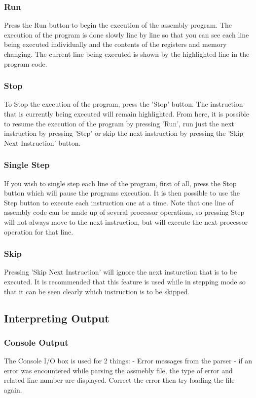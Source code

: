 \subsubsection{Run}
Press the Run button to begin the execution of the assembly program.  The execution of the program is done slowly line by line so that you can see each line being executed individually and the contents of the registers and memory changing.  The current line being executed is shown by the highlighted line in the program code.

\subsubsection{Stop}
To Stop the execution of the program, press the 'Stop' button.  The instruction that is currently being executed will remain highlighted.  From here, it is possible to resume the execution of the program by pressing 'Run', run just the next instruction by pressing 'Step' or skip the next instruction by pressing the 'Skip Next Instruction' button.

\subsubsection{Single Step}
If you wish to single step each line of the program, first of all, press the Stop button which will pause the programs execution.  It is then possible to use the Step button to execute each instruction one at a time.  Note that one line of assembly code can be made up of several processor operations, so pressing Step will not always move to the next instruction, but will execute the next processor operation for that line.

\subsubsection{Skip}
Pressing 'Skip Next Instruction' will ignore the next insturction that is to be executed.  It is recommended that this feature is used while in stepping mode so that it can be seen clearly which instruction is to be skipped.


\subsection{Interpreting Output}


\subsubsection{Console Output}
The Console I/O box is used for 2 things:
- Error messages from the parser - if an error was encountered while parsing the assmebly file, the type of error and related line number are displayed.  Correct the error then try loading the file again.

